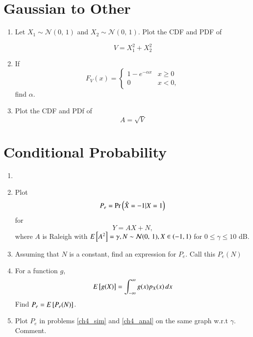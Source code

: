 \documentclass[journal,12pt,twocolumn]{IEEEtran}
\renewcommand\thesection{\arabic{section}}
\begin{document}
\section{Gaussian to Other}
\begin{enumerate}[label=\thesection.\arabic*
,ref=\thesection.\theenumi]

\item Let $X_1 \sim \mathcal{N}(0,\,1)$ and $X_2 \sim \mathcal{N}(0,\,1)$. Plot the CDF and PDF of
	
	\begin{equation}
	V = X_1^2 + X_2^2
	\end{equation}
	
\item If
	\begin{equation}
	F_{V}(x) = 
	\begin{cases}
	1 - e^{-\alpha x} & x \geq 0 \\
	0 & x < 0,
	\end{cases}
	\end{equation}
	find $\alpha$.

\item
	\label{ch3_raleigh_sim}
	Plot the CDF and PDf of
	\begin{equation}
	A = \sqrt{V}
	\end{equation}
	
\end{enumerate}

\section{Conditional Probability}
\begin{enumerate}[label=\thesection.\arabic*
,ref=\thesection.\theenumi]

\item

\item
	\label{ch4_sim}
	Plot 
	\begin{equation}
	P_e = \Pr\left(\hat{X} = -1|X=1\right)
	\end{equation}
	for 
	\begin{equation}
	Y = AX+N,
	\end{equation}
	where $A$ is Raleigh with $E{}\left[A^2\right] = \gamma, N \sim \mathcal{N}(0,\,1), X \in \left(-1,1\right)$ for $0 \le \gamma \le 10$ dB.
	
\item
	Assuming that $N$ is a constant, find an expression for $P_e$.  Call this $P_e(N)$
	
\item
	\label{ch4_anal}
	For a function $g$,
	\begin{equation}
	E{}\left[g(X)\right] = \int_{-\infty}^{\infty}g(x)p_{X}(x)\, dx
	\end{equation}
	Find $P_e = E{}\left[P_e(N)\right]$.
	
\item
	Plot $P_e$ in problems \ref{ch4_sim} and \ref{ch4_anal} on the same graph w.r.t $\gamma$.  Comment.

\end{enumerate}
\end{document}
